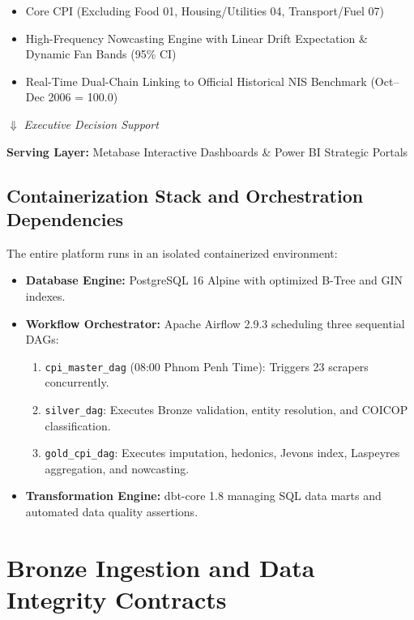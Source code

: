 \documentclass[11pt,a4paper]{article}
\begin{document}
\begin{center}
\begin{tcolorbox}[colback=white,colframe=NavyBlue,width=\textwidth,title=\bfseries End-to-End Pipeline Data Flow]
\begin{itemize}[noitemsep]
    \item Core CPI (Excluding Food 01, Housing/Utilities 04, Transport/Fuel 07)
    \item High-Frequency Nowcasting Engine with Linear Drift Expectation \& Dynamic Fan Bands (95\% CI)
    \item Real-Time Dual-Chain Linking to Official Historical NIS Benchmark (Oct--Dec 2006 = 100.0)
\end{itemize}
\centering $\Downarrow$ \textit{Executive Decision Support} \\
\raggedright
\textbf{Serving Layer:} Metabase Interactive Dashboards \& Power BI Strategic Portals
\end{tcolorbox}
\end{center}

\subsection{Containerization Stack and Orchestration Dependencies}
The entire platform runs in an isolated containerized environment:
\begin{itemize}[noitemsep]
    \item \textbf{Database Engine:} PostgreSQL 16 Alpine with optimized B-Tree and GIN indexes.
    \item \textbf{Workflow Orchestrator:} Apache Airflow 2.9.3 scheduling three sequential DAGs:
        \begin{enumerate}
            \item \texttt{cpi\_master\_dag} (08:00 Phnom Penh Time): Triggers 23 scrapers concurrently.
            \item \texttt{silver\_dag}: Executes Bronze validation, entity resolution, and COICOP classification.
            \item \texttt{gold\_cpi\_dag}: Executes imputation, hedonics, Jevons index, Laspeyres aggregation, and nowcasting.
        \end{enumerate}
    \item \textbf{Transformation Engine:} dbt-core 1.8 managing SQL data marts and automated data quality assertions.
\end{itemize}

\newpage

\section{Bronze Ingestion and Data Integrity Contracts}
\end{document}
